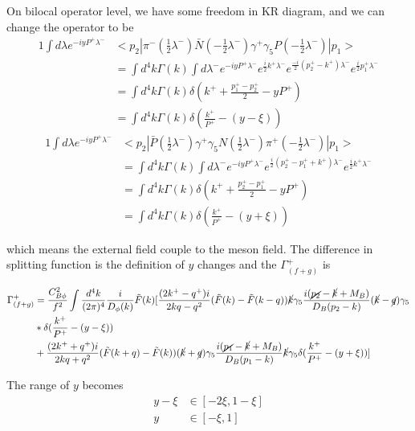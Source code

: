 \documentclass[preprintnumbers,prd,superscriptaddress,preprint]{revtex4-1}
\begin{document}
	On bilocal operator level, we have some freedom in KR diagram, and
	we can change the operator to be 
	\begin{alignat*}{1}
		\int d\lambda e^{-iyP^{+}\lambda^{-}} & <p_{2}|\pi^{-}(\frac{1}{2}\lambda^{-})\bar{N}(-\frac{1}{2}\lambda^{-})\gamma^{+}\gamma_{5}P(-\frac{1}{2}\lambda^{-})|p_{1}>\\
		& =\int d^{4}k\Gamma(k)\int d\lambda^{-}e^{-iyP^{+}\lambda^{-}}e^{\frac{i}{2}k^{+}\lambda^{-}}e^{\frac{-i}{2}(p_{2}^{+}-k^{+})\lambda^{-}}e^{\frac{i}{2}p_{1}^{+}\lambda^{-}}\\
		& =\int d^{4}k\Gamma(k)\delta(k^{+}+\frac{p_{1}^{+}-p_{2}^{+}}{2}-yP^{+})\\
		& =\int d^{4}k\Gamma(k)\delta(\frac{k^{+}}{P^{+}}-(y-\xi))
	\end{alignat*}
	\begin{alignat*}{1}
		\int d\lambda e^{-iyP^{+}\lambda^{-}} & <p_{2}|\bar{P}(\frac{1}{2}\lambda^{-})\gamma^{+}\gamma_{5}N(\frac{1}{2}\lambda^{-})\pi^{+}(-\frac{1}{2}\lambda^{-})|p_{1}>\\
		& =\int d^{4}k\Gamma(k)\int d\lambda^{-}e^{-iyP^{+}\lambda^{-}}e^{\frac{i}{2}(p_{2}^{+}-p_{1}^{+}+k^{+})\lambda^{-}}e^{\frac{i}{2}k^{+}\lambda^{-}}\\
		& =\int d^{4}k\Gamma(k)\delta(k^{+}+\frac{p_{2}^{+}-p_{1}^{+}}{2}-yP^{+})\\
		& =\int d^{4}k\Gamma(k)\delta(\frac{k^{+}}{P^{+}}-(y+\xi))
	\end{alignat*}
	
	which means the external field couple to the meson field. The difference in splitting function is the definition of $y$ changes and the $\Gamma_{(f+g)}^{+}$ is 
	
	\begin{align*}
		\Gamma_{(f+g)}^{+} & =\frac{C_{B\phi}^{2}}{f^{2}}\int\frac{d^{4}k}{(2\pi)^{4}}\frac{i}{D_{\phi}(k)}\tilde{F}(k)[\frac{(2k^{+}-q^{+})i}{2kq-q^{2}}(\tilde{F}(k)-\tilde{F}(k-q))\cancel{k}\gamma_{5}\frac{i(\cancel{p_{2}}-\cancel{k}+M_{B})}{D_{B}(p_{2}-k)}(\cancel{k}-\cancel{q})\gamma_{5}\\
		& *\delta(\frac{k^{+}}{P^{+}}-(y-\xi))\\
		& +\frac{(2k^{+}+q^{+})i}{2kq+q^{2}}(\tilde{F}(k+q)-\tilde{F}(k))(\cancel{k}+\cancel{q})\gamma_{5}\frac{i(\cancel{p_{1}}-\cancel{k}+M_{B})}{D_{B}(p_{1}-k)}\cancel{k}\gamma_{5}\delta(\frac{k^{+}}{P^{+}}-(y+\xi))]
	\end{align*}
	
	The range of $y$ becomes
	\begin{align*}
		y-\xi & \in[-2\xi,1-\xi]\\
		y & \in[-\xi,1]
	\end{align*}
	
\end{document}
